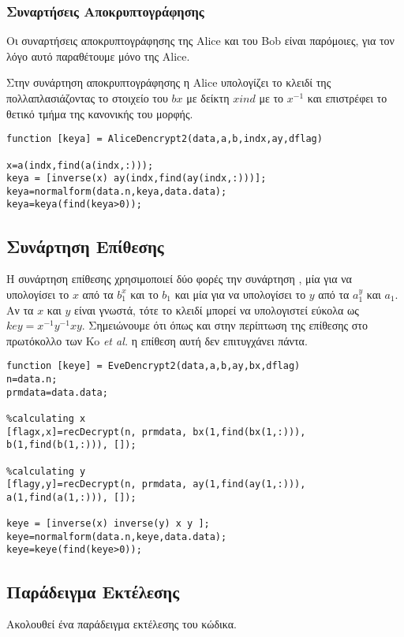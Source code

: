 \subsubsection{Συναρτήσεις Αποκρυπτογράφησης}

Οι συναρτήσεις αποκρυπτογράφησης της Alice και του Bob είναι παρόμοιες, για τον λόγο αυτό παραθέτουμε μόνο της Alice.

Στην συνάρτηση αποκρυπτογράφησης η Alice υπολογίζει το κλειδί της πολλαπλασιάζοντας το στοιχείο του $ bx $ με δείκτη $ xind$ με το $ x^{-1} $ και επιστρέφει το θετικό τμήμα της κανονικής του μορφής.
\begin{lstlisting}
function [keya] = AliceDencrypt2(data,a,b,indx,ay,dflag)

x=a(indx,find(a(indx,:)));
keya = [inverse(x) ay(indx,find(ay(indx,:)))];
keya=normalform(data.n,keya,data.data);
keya=keya(find(keya>0));
\end{lstlisting}

\subsection{Συνάρτηση Επίθεσης}

Η συνάρτηση επίθεσης χρησιμοποιεί δύο φορές την συνάρτηση , μία για να υπολογίσει το $ x $ από τα $ b_1^x $ και το $ b_1 $ και μία για να υπολογίσει το $ y $ από τα $ a_1^y $ και $ a_1 $. Αν τα $ x $ και $ y $ είναι γνωστά, τότε το κλειδί μπορεί να υπολογιστεί εύκολα ως $ key=x^{-1}y^{-1}xy $. Σημειώνουμε ότι όπως και στην περίπτωση της επίθεσης στο πρωτόκολλο των Ko \textit{et al.} η επίθεση αυτή δεν επιτυγχάνει πάντα.
\begin{lstlisting}
function [keye] = EveDencrypt2(data,a,b,ay,bx,dflag)
n=data.n;
prmdata=data.data;

%calculating x
[flagx,x]=recDecrypt(n, prmdata, bx(1,find(bx(1,:))), b(1,find(b(1,:))), []);

%calculating y
[flagy,y]=recDecrypt(n, prmdata, ay(1,find(ay(1,:))), a(1,find(a(1,:))), []);

keye = [inverse(x) inverse(y) x y ];
keye=normalform(data.n,keye,data.data);
keye=keye(find(keye>0));
\end{lstlisting}


\subsection{Παράδειγμα Εκτέλεσης}
Ακολουθεί ένα παράδειγμα εκτέλεσης του κώδικα.

